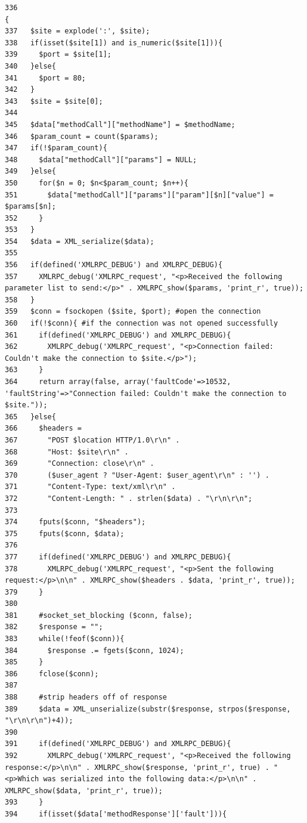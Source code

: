 \begin{Code}\begin{verbatim}336                                                                                           {
337   $site = explode(':', $site);
338   if(isset($site[1]) and is_numeric($site[1])){
339     $port = $site[1];
340   }else{
341     $port = 80;
342   }
343   $site = $site[0];
344 
345   $data["methodCall"]["methodName"] = $methodName;
346   $param_count = count($params);
347   if(!$param_count){
348     $data["methodCall"]["params"] = NULL;
349   }else{
350     for($n = 0; $n<$param_count; $n++){
351       $data["methodCall"]["params"]["param"][$n]["value"] = $params[$n];
352     }
353   }
354   $data = XML_serialize($data);
355 
356   if(defined('XMLRPC_DEBUG') and XMLRPC_DEBUG){
357     XMLRPC_debug('XMLRPC_request', "<p>Received the following parameter list to send:</p>" . XMLRPC_show($params, 'print_r', true));
358   }
359   $conn = fsockopen ($site, $port); #open the connection
360   if(!$conn){ #if the connection was not opened successfully
361     if(defined('XMLRPC_DEBUG') and XMLRPC_DEBUG){
362       XMLRPC_debug('XMLRPC_request', "<p>Connection failed: Couldn't make the connection to $site.</p>");
363     }
364     return array(false, array('faultCode'=>10532, 'faultString'=>"Connection failed: Couldn't make the connection to $site."));
365   }else{
366     $headers =
367       "POST $location HTTP/1.0\r\n" .
368       "Host: $site\r\n" .
369       "Connection: close\r\n" .
370       ($user_agent ? "User-Agent: $user_agent\r\n" : '') .
371       "Content-Type: text/xml\r\n" .
372       "Content-Length: " . strlen($data) . "\r\n\r\n";
373 
374     fputs($conn, "$headers");
375     fputs($conn, $data);
376 
377     if(defined('XMLRPC_DEBUG') and XMLRPC_DEBUG){
378       XMLRPC_debug('XMLRPC_request', "<p>Sent the following request:</p>\n\n" . XMLRPC_show($headers . $data, 'print_r', true));
379     }
380 
381     #socket_set_blocking ($conn, false);
382     $response = "";
383     while(!feof($conn)){
384       $response .= fgets($conn, 1024);
385     }
386     fclose($conn);
387 
388     #strip headers off of response
389     $data = XML_unserialize(substr($response, strpos($response, "\r\n\r\n")+4));
390 
391     if(defined('XMLRPC_DEBUG') and XMLRPC_DEBUG){
392       XMLRPC_debug('XMLRPC_request', "<p>Received the following response:</p>\n\n" . XMLRPC_show($response, 'print_r', true) . "<p>Which was serialized into the following data:</p>\n\n" . XMLRPC_show($data, 'print_r', true));
393     }
394     if(isset($data['methodResponse']['fault'])){

\end{verbatim}
\end{Code}
